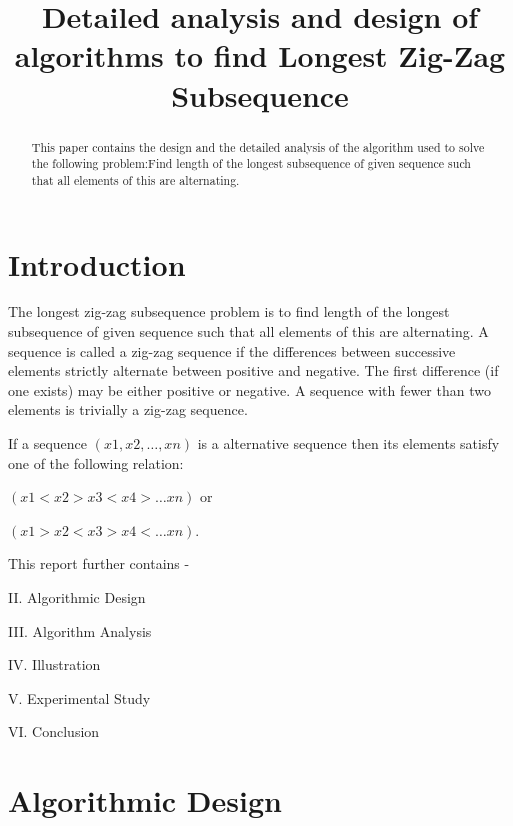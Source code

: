 \documentclass[conference]{IEEEtran}
\begin{document}
\title{Detailed analysis and design of algorithms to find Longest Zig-Zag Subsequence\\

}

\author{
\and
{}
\and
{}
}

\maketitle

\begin{abstract}
This paper contains the design and the detailed analysis of the algorithm used to solve the following problem:Find length of the longest
subsequence of given sequence such that all elements of this are
alternating.
\end{abstract}
\section{Introduction}


The longest zig-zag subsequence problem is to find length of the longest
subsequence of given sequence such that all elements of this are
alternating. A sequence is called a zig-zag sequence if the differences between successive elements strictly alternate between positive and negative. The first difference (if one exists) may be either positive or negative. A sequence with fewer than two elements is trivially a zig-zag sequence.

If a sequence $(x1,x2,\dots,xn)$ is a alternative sequence then its elements satisfy one of the following relation:

$(x1<x2>x3<x4>\dots xn)$ or

$(x1>x2<x3>x4<\dots xn)$.

This report further contains -

II. Algorithmic Design

III. Algorithm Analysis

IV. Illustration

V. Experimental Study

VI. Conclusion 

\section{Algorithmic Design}
\end{document}
